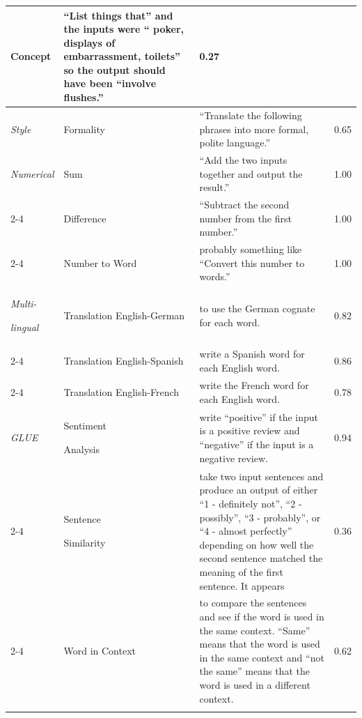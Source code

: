 \begin{table}[H]
\begin{tabular}{@{}p{}@{}p{}@{}p{}c}
Concept &  ``List things that'' and the inputs were `` poker, displays of embarrassment, toilets'' so the output should have been ``involve flushes.''	& 0.27\\
\midrule
\textit{Style} & Formality &  ``Translate the following phrases into more formal, polite language.''	& 0.65\\
\midrule
\textit{Numerical}         & Sum            & ``Add the two inputs together and output the result.''	& 1.00\\
\cmidrule{2-4}
                                   & Difference     &  ``Subtract the second number from the first number.''	& 1.00\\
\cmidrule{2-4}
                                   & Number to Word & probably something like ``Convert this number to words.''	& 1.00\\
\midrule
\textit{Multi-}

\textit{lingual} & Translation English-German   & to use the German cognate for each word.	& 0.82\\
\cmidrule{2-4}
    & Translation English-Spanish & write a Spanish word for each English word.	& 0.86 \\
\cmidrule{2-4}
    & Translation English-French & write the French word for each English word.& 0.78 \\
\midrule
\textit{GLUE} & Sentiment 

Analysis & write ``positive'' if the input is a positive review and ``negative'' if the input is a negative review.	& 0.94\\
\cmidrule{2-4}
& Sentence 

Similarity &  take two input sentences and produce an output of either ``1 - definitely not'', ``2 - possibly'', ``3 - probably'', or ``4 - almost perfectly'' depending on how well the second sentence matched the meaning of the first sentence. It appears
 & 0.36 \\
\cmidrule{2-4}
& Word in Context &  to compare the sentences and see if the word is used in the same context. ``Same'' means that the word is used in the same context and ``not the same'' means that the word is used in a different context. & 0.62\\
\bottomrule
\\
\end{tabular}
\end{table}

